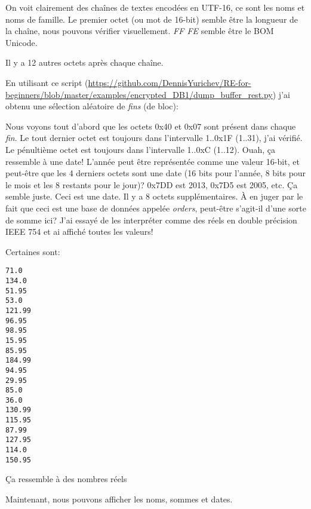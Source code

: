 On voit clairement des chaînes de textes encodées en UTF-16, ce sont les noms et
noms de famille.
Le premier octet (ou mot de 16-bit) semble être la longueur de la chaîne, nous pouvons
vérifier visuellement.
\emph{FF FE} semble être le \ac{BOM} Unicode.

Il y a 12 autres octets après chaque chaîne.

En utilisant ce script
(\url{https://github.com/DennisYurichev/RE-for-beginners/blob/master/examples/encrypted_DB1/dump_buffer_rest.py})
j'ai obtenu une sélection aléatoire de \emph{fins} (de bloc):



Nous voyons tout d'abord que les octets 0x40 et 0x07 sont présent dans chaque \emph{fin}.
Le tout dernier octet est toujours dans l'intervalle 1..0x1F (1..31), j'ai vérifié.
Le pénultième octet est toujours dans l'intervalle 1..0xC (1..12).
Ouah, ça ressemble à une date!
L'année peut être représentée comme une valeur 16-bit, et peut-être que les 4 derniers
octets sont une date (16 bits pour l'année, 8 bits pour le mois et les 8 restants
pour le jour)?
0x7DD est 2013, 0x7D5 est 2005, etc. Ça semble juste. Ceci est une date.
Il y a 8 octets supplémentaires.
À en juger par le fait que ceci est une base de données appelée \emph{orders}, peut-être
s'agit-il d'une sorte de somme ici?
J'ai essayé de les interpréter comme des réels en double précision IEEE 754 et ai
affiché toutes les valeurs!

Certaines sont:

\begin{lstlisting}
71.0
134.0
51.95
53.0
121.99
96.95
98.95
15.95
85.95
184.99
94.95
29.95
85.0
36.0
130.99
115.95
87.99
127.95
114.0
150.95
\end{lstlisting}

Ça ressemble à des nombres réels

Maintenant, nous pouvons afficher les noms, sommes et dates.

